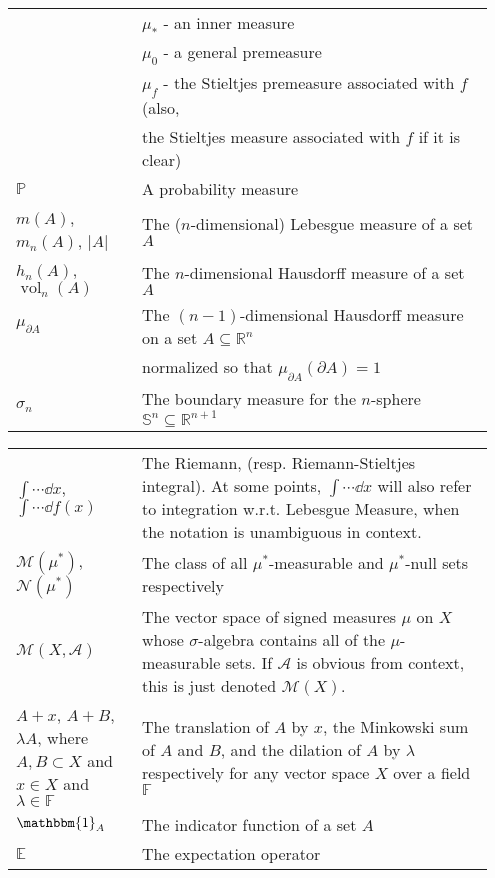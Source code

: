 \begin{center}
\begin{tabular}{|p{0.25\linewidth}|p{0.7\linewidth}|}
	& \qquad $\mu_*$ - an inner measure \\
	& \qquad $\mu_0$ - a general premeasure \\
	& \qquad $\mu_f$ - the Stieltjes premeasure associated with $f$ (also, \\
	& \qquad\qquad the Stieltjes measure associated with $f$ if it is clear)\smallskip\\
	$\mathbb{P}$ & A probability measure \\
	$m(A)$, $m_n(A)$, $|A|$ & The ($n$-dimensional) Lebesgue measure of a set $A$\\
	$h_n(A)$, $\operatorname{vol}_n(A)$ & The $n$-dimensional Hausdorff measure of a set $A$\\
	$\mu_{\partial A}$ & The $(n-1)$-dimensional Hausdorff measure on a set $A\subseteq \mathbb{R}^n$ \\
	& normalized so that $\mu_{\partial A}(\partial A) = 1$\\
	$\sigma_n$ & The boundary measure for the $n$-sphere $\mathbb{S}^n\subseteq \mathbb{R}^{n+1}$\\
	\hline
\end{tabular}
\end{center}
\newpage
\begin{center}
\begin{tabular}{|p{0.25\linewidth}|p{0.7\linewidth}|}
	\hline\medskip

	$\displaystyle \int \cdots \dd{x}$,  $\displaystyle \int \cdots \dd{f(x)}$ & The Riemann, (resp. Riemann-Stieltjes integral). At some points, $\int \cdots \dd{x}$ will also refer to integration w.r.t. Lebesgue Measure, when the notation is unambiguous in context. \smallskip\\
	$\mathcal{M}(\mu^*)$, $\mathcal{N}(\mu^*)$ & The class of all $\mu^*$-measurable and $\mu^*$-null sets respectively\smallskip\\
	$\mathcal{M}(X, \mathcal{A})$ & The vector space of signed measures $\mu$ on $X$ whose $\sigma$-algebra contains all of the $\mu$-measurable sets. If $\mathcal{A}$ is obvious from context, this is just denoted $\mathcal{M}(X)$. \smallskip\\
	$A +x$, $A + B$, $\lambda A$, where $A, B \subset X$ and $x\in X$ and $\lambda \in \mathbb{F}$ & The translation of $A$ by $x$, the Minkowski sum of $A$ and $B$, and the dilation of $A$ by $\lambda$ respectively for any vector space $X$ over a field $\mathbb{F}$\\
	$\mathbbm{1}_A$ & The indicator function of a set $A$\\
	$\mathbb{E}$ & The expectation operator\\

	\hline
\end{tabular}
\end{center}
